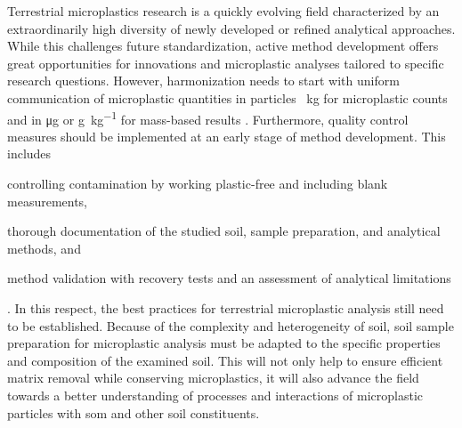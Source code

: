 Terrestrial microplastics research is a quickly evolving field characterized by an extraordinarily high diversity of newly developed or refined analytical approaches. While this challenges future standardization, active method development offers great opportunities for innovations and microplastic analyses tailored to specific research questions. However, harmonization needs to start with uniform communication of microplastic quantities in particles \si{\per\kilo\gram} for microplastic counts and in \si{\micro\gram} or \si{\gram\per\kilo\gram} for mass-based results \citep{BraunMicroplastics2018}. Furthermore, quality control measures should be implemented at an early stage of method development.
This includes
\begin{enumerate*}
	\item controlling contamination by working plastic-free and including blank measurements,
	\item thorough documentation of the studied soil, sample preparation, and analytical methods, and
	\item method validation with recovery tests and an assessment of analytical limitations
\end{enumerate*}.
In this respect, the best practices for terrestrial microplastic analysis still need to be established. Because of the complexity and heterogeneity of soil, soil sample preparation for microplastic analysis must be adapted to the specific properties and composition of the examined soil.
This will not only help to ensure efficient matrix removal while conserving microplastics, it will also advance the field towards a better understanding of processes and interactions of microplastic particles with \ac{som} and other soil constituents.
